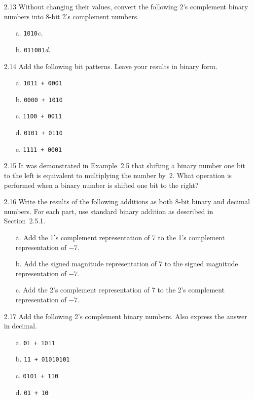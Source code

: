 \documentclass{patt}
\begin{document}
\begin{exercises}
\item[2.13] Without changing their values, convert the following 2's complement
binary numbers into 8-bit 2's complement numbers.
\begin{enumerate}[d.]
\item[a.] {\tt 1010}\qquad\quad\quad\qquad \textit{c.}
\item[b.] {\tt 011001}\qquad\quad\quad\qquad\hspace*{-1pc}\textit{d.}
\end{enumerate}

\item[2.14] Add the following bit patterns. Leave
your results in binary form.
\begin{enumerate}[d.]
\item[a.] {\tt 1011 + 0001}
\item[b.] {\tt 0000 + 1010}
\item[c.] {\tt 1100 + 0011}
\item[d.] {\tt 0101 + 0110}
\item[e.] {\tt 1111 + 0001}
\end{enumerate}

\item[2.15] It was demonstrated in Example~2.5 that shifting a binary number
one bit to the left is equivalent to multiplying the number by~2.
What operation is performed when
a binary number is shifted one bit to the right?

\item[2.16] Write the results of the following additions as both
8-bit binary and decimal numbers. For each part, use standard
binary addition as described in Section~2.5.1.
\begin{enumerate}[c.]
\item[a.] Add the 1's complement representation of 7 to the
1's complement representation of ${-}7.$
\item[b.] Add the signed magnitude representation of 7 to the signed
  magnitude representation of ${-}7$.
\item[c.] Add the 2's complement representation of 7 to the 2's
  complement representation of ${-}7$.
\end{enumerate}

\item[2.17] Add the following 2's complement binary numbers.
Also express the answer in decimal.
\begin{enumerate}[d.]
\item[a.] {\tt 01 + 1011}
\item[b.] {\tt 11 + 01010101}
\item[c.] {\tt 0101 + 110}
\item[d.] {\tt 01 + 10}
\end{enumerate}


\end{exercises}
\end{document}
